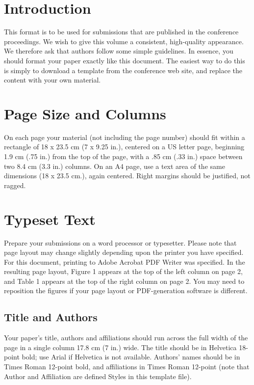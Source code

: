 \documentclass{ubicomp2013}
\begin{document}
\section{Introduction}

This format is to be used for submissions that are published in the
conference proceedings.  We wish to give this volume a consistent,
high-quality appearance. We therefore ask that authors follow some
simple guidelines. In essence, you should format your paper exactly
like this document. The easiest way to do this is simply to download
a template from the conference web site, and replace the content
with your own material.
\section{Page Size and Columns}

On each page your material (not including the page number) should fit
within a rectangle of 18 x 23.5 cm (7 x 9.25 in.), centered on a US
letter page, beginning 1.9 cm (.75 in.) from the top of the page, with
a .85 cm (.33 in.) space between two 8.4 cm (3.3 in.) columns.  On an
A4 page, use a text area of the same dimensions (18 x 23.5 cm.), again
centered.  Right margins should be justified, not ragged.

\section{Typeset Text}

Prepare your submissions on a word processor or typesetter. Please note that page layout may change slightly depending upon the printer you have specified. For this document, printing to Adobe Acrobat PDF Writer was specified. In the resulting page layout, Figure 1 appears at the top of the left column on page 2, and Table 1 appears at the top of the right column on page 2. You may need to reposition the figures if your page layout or PDF-generation software is different.

\subsection{Title and Authors}

Your paper's title, authors and affiliations should run across the
full width of the page in a single column 17.8 cm (7 in.) wide.  The
title should be in Helvetica 18-point bold; use Arial if Helvetica is
not available.  Authors' names should be in Times Roman 12-point bold,
and affiliations in Times Roman 12-point (note that Author and
Affiliation are defined Styles in this template file).
\end{document}

